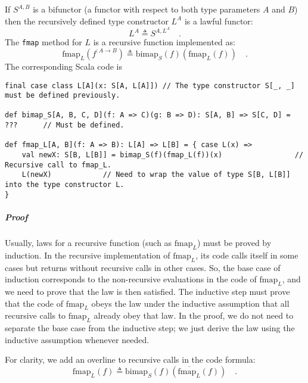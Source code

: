 If $S^{A,B}$ is a bifunctor (a functor with respect to both type
parameters $A$ and $B$) then the recursively defined type constructor
$L^{A}$ is a lawful functor:
\[
L^{A}\triangleq S^{A,L^{A}}\quad.
\]
The \lstinline!fmap! method for $L$ is a recursive function implemented
as:
\begin{equation}
\text{fmap}_{L}(f^{:A\rightarrow B})\triangleq\text{bimap}_{S}(f)(\text{fmap}_{L}(f))\quad.\label{eq:def-recursive-functor-fmap}
\end{equation}
The corresponding Scala code is
\begin{lstlisting}
final case class L[A](x: S[A, L[A]]) // The type constructor S[_, _] must be defined previously.

def bimap_S[A, B, C, D](f: A => C)(g: B => D): S[A, B] => S[C, D] = ???      // Must be defined.

def fmap_L[A, B](f: A => B): L[A] => L[B] = { case L(x) =>
    val newX: S[B, L[B]] = bimap_S(f)(fmap_L(f))(x)                 // Recursive call to fmap_L.
    L(newX)            // Need to wrap the value of type S[B, L[B]] into the type constructor L.
}
\end{lstlisting}


\subparagraph{Proof}

Usually, laws for a recursive
function (such as $\text{fmap}_{L}$) must be proved by induction.
In the recursive implementation of $\text{fmap}_{L}$, its code calls
itself in some cases but returns without recursive calls in other
cases. So, the base case of induction corresponds to the non-recursive
evaluations in the code of $\text{fmap}_{L}$, and we need to prove
that the law is then satisfied. The inductive step must prove that
the code of $\text{fmap}_{L}$ obeys the law under the inductive assumption
that all recursive calls to $\text{fmap}_{L}$ already obey that law.
In the proof, we do not need to separate the base case from the inductive
step; we just derive the law using the inductive assumption whenever
needed.

For clarity, we add an overline to recursive calls in the code formula:
\[
\text{fmap}_{L}(f)\triangleq\text{bimap}_{S}(f)(\overline{\text{fmap}_{L}}(f))\quad.
\]

